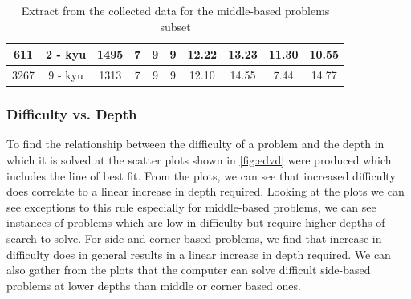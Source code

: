 \documentclass{l4proj}
\begin{document}
\begin{table}[!ht]
\begin{tabular}{|c|c|c|c|c|c|c|c|c|c|}
611 & 2 - kyu & 1495 & 7 & 9 & 9 & 12.22 & 13.23 & 11.30 & 10.55 \\ \hline
3267 & 9 - kyu & 1313 & 7 & 9 & 9 & 12.10 & 14.55 & 7.44 & 14.77 \\ \hline

\end{tabular}
\caption{Extract from the collected data for the middle-based problems subset}
\label{table:extract-middle}
\end{table}




\subsubsection{Difficulty vs. Depth}

To find the relationship between the difficulty of a problem and the depth in which it is solved at the scatter plots shown in \autoref{fig:edvd} were produced which includes the line of best fit. From the plots, we can see that increased difficulty does correlate to a linear increase in depth required. Looking at the plots we can see exceptions to this rule especially for middle-based problems, we can see instances of problems which are low in difficulty but require higher depths of search to solve. For side and corner-based problems, we find that increase in difficulty does in general results in a linear increase in depth required. We can also gather from the plots that the computer can solve difficult side-based problems at lower depths than middle or corner based ones.
\end{document}
